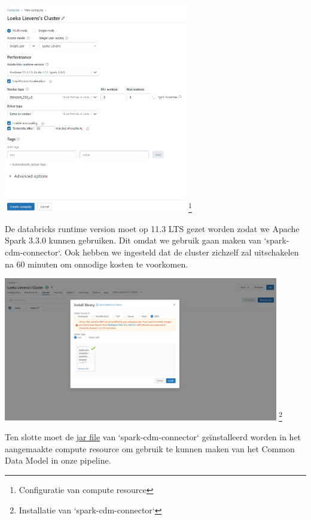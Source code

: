 \begin{center}
    \includegraphics[width=0.6\textwidth]{./graphics/databricks/initial_5.png}
    \footnote{Configuratie van compute resource}
\end{center}

De databricks runtime version moet op 11.3 LTS gezet worden zodat we Apache Spark 3.3.0 kunnen gebruiken. Dit omdat we gebruik gaan maken van `spark-cdm-connector`. Ook hebben we ingesteld dat de cluster zichzelf zal uitschakelen na 60 minuten om onnodige kosten te voorkomen.

\begin{center}
    \includegraphics[width=0.9\textwidth]{./graphics/databricks/initial_6.png}
    \footnote{Installatie van `spark-cdm-connector`}
\end{center}

Ten slotte moet de \href{https://github.com/Azure/spark-cdm-connector/releases/tag/spark3.3-1.19.5}{jar file} van `spark-cdm-connector` geïnstalleerd worden in het aangemaakte compute resource om gebruik te kunnen maken van het Common Data Model in onze pipeline.

